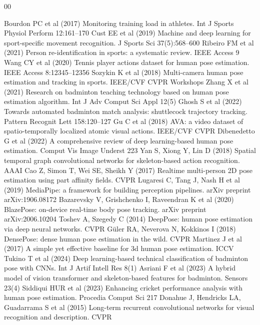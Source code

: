 \documentclass[pdflatex,sn-mathphys-num]{sn-jnl}
\theoremstyle{thmstyleone}%
\theoremstyle{thmstyletwo}%
\theoremstyle{thmstylethree}%
\begin{document}
\begin{thebibliography}{00}

 Bourdon PC et al (2017) Monitoring training load in athletes. Int J Sports Physiol Perform 12:161--170
 Cust EE et al (2019) Machine and deep learning for sport-specific movement recognition. J Sports Sci 37(5):568--600
 Ribeiro FM et al (2021) Person re-identification in sports: a systematic review. IEEE Access 9
 Wang CY et al (2020) Tennis player actions dataset for human pose estimation. IEEE Access 8:12345--12356
 Sozykin K et al (2018) Multi-camera human pose estimation and tracking in sports. IEEE/CVF CVPR Workshops
 Zhang X et al (2021) Research on badminton teaching technology based on human pose estimation algorithm. Int J Adv Comput Sci Appl 12(5)
 Ghosh S et al (2022) Towards automated badminton match analysis: shuttlecock trajectory tracking. Pattern Recognit Lett 158:120--127
 Gu C et al (2018) AVA: a video dataset of spatio-temporally localized atomic visual actions. IEEE/CVF CVPR
 Dibenedetto G et al (2022) A comprehensive review of deep learning-based human pose estimation. Comput Vis Image Underst 223
 Yan S, Xiong Y, Lin D (2018) Spatial temporal graph convolutional networks for skeleton-based action recognition. AAAI
 Cao Z, Simon T, Wei SE, Sheikh Y (2017) Realtime multi-person 2D pose estimation using part affinity fields. CVPR
 Lugaresi C, Tang J, Nash H et al (2019) MediaPipe: a framework for building perception pipelines. arXiv preprint arXiv:1906.08172
 Bazarevsky V, Grishchenko I, Raveendran K et al (2020) BlazePose: on-device real-time body pose tracking. arXiv preprint arXiv:2006.10204
 Toshev A, Szegedy C (2014) DeepPose: human pose estimation via deep neural networks. CVPR
 G\"uler RA, Neverova N, Kokkinos I (2018) DensePose: dense human pose estimation in the wild. CVPR
 Martinez J et al (2017) A simple yet effective baseline for 3d human pose estimation. ICCV
 Tukino T et al (2024) Deep learning-based technical classification of badminton pose with CNNs. Int J Artif Intell Res 8(1)
 Asriani F et al (2023) A hybrid model of vision transformer and skeleton-based features for badminton. Sensors 23(4)
 Siddiqui HUR et al (2023) Enhancing cricket performance analysis with human pose estimation. Procedia Comput Sci 217
 Donahue J, Hendricks LA, Guadarrama S et al (2015) Long-term recurrent convolutional networks for visual recognition and description. CVPR

\end{thebibliography}
\end{document}
